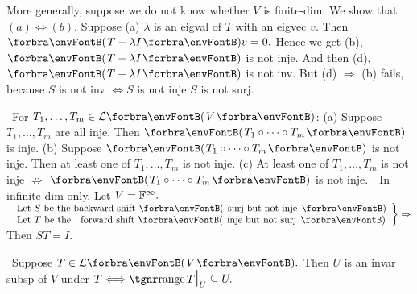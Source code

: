 \documentclass[a4paper, 11pt, UTF8]{article}
\begin{document}
\begin{large}
\vfill
\BulletPointX\NoteForSmall{[5.6]}\TextB{}
More generally, suppose we do not know whether $V$ is finite-dim. We show that $(a)\Longleftrightarrow(b).$\TextB{}
Suppose (a) $\lambda$ is an eigval of $T$ with an eigvec $v.$ Then $\Par{T-\lambda I}v=0.$\TextB{}
Hence we get (b), $\Par{T-\lambda I}$ is not inje. And then (d), $\Par{T-\lambda I}$ is not inv.\TextB{}
But (d) $\Rightarrow$ (b) fails, because $S$ is not inv $\Longleftrightarrow S$ is not inje \OR $S$ is not surj.\par
\SepLine



\BulletPointX\Tips \,\,\,For $T_1,\dots,T_m\in\Lm{V}$:\TextB{\vspace{-2pt}}
(a) Suppose $T_1,\dots,T_m$ are all inje. Then $\Par{T_1\circ\cdots\circ T_m}$ is inje.\TextB{}
(b) Suppose $\Par{T_1\circ\cdots\circ T_m}$ is not inje. Then at least one of $T_1,\dots,T_m$ is not inje.\TextB{}
(c) At least one of $T_1,\dots,T_m$ is not inje $\nRightarrow$ $\Par{T_1\circ\cdots\circ T_m}$ is not inje.\TextB{}
\Hc\Example\,\, In infinite-dim only. Let $V={\mathbb{F}}^\infty.$\TextE{}
\;\;\,$\MathRightBrace{l}{$ Let $S$ be the backward shift \Par{ surj but not inje }$\\$ Let $T$ be the \,\,\,\,forward shift \Par{ inje but not surj }$}\Rightarrow$ Then $ST=I.$\PfEnd
\SepLine\pagebreak

\BulletPointX\NoteForSmall{[5.2]}\,\,\,Suppose $T\in\Lm{V}.$ Then $U$ is an invar subsp of $V$ under $T\Longleftrightarrow\range T\mid_U\subseteq U.$
\SepLine


\end{large}
\end{document}
